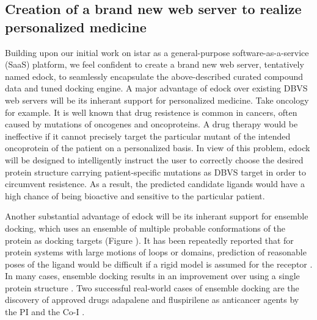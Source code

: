 \documentclass[a4paper,12pt]{article}
\begin{document}


\subsection*{Creation of a brand new web server to realize personalized medicine}

Building upon our initial work on istar \citep{1362} as a general-purpose software-as-a-service (SaaS) platform, we feel confident to create a brand new web server, tentatively named edock, to seamlessly encapsulate the above-described curated compound data and tuned docking engine. A major advantage of edock over existing DBVS web servers will be its inherant support for personalized medicine. Take oncology for example. It is well known that drug resistence is common in cancers, often caused by mutations of oncogenes and oncoproteins. A drug therapy would be ineffective if it cannot precisely target the particular mutant of the intended oncoprotein of the patient on a personalized basis. In view of this problem, edock will be designed to intelligently instruct the user to correctly choose the desired protein structure carrying patient-specific mutations as DBVS target in order to circumvent resistence. As a result, the predicted candidate ligands would have a high chance of being bioactive and sensitive to the particular patient.

Another substantial advantage of edock will be its inherant support for ensemble docking, which uses an ensemble of multiple probable conformations of the protein as docking targets (Figure ). It has been repeatedly reported that for protein systems with large motions of loops or domains, prediction of reasonable poses of the ligand would be difficult if a rigid model is assumed for the receptor \citep{1730}. In many cases, ensemble docking results in an improvement over using a single protein structure \citep{1128}. Two successful real-world cases of ensemble docking are the discovery of approved drugs adapalene and fluspirilene as anticancer agents by the PI and the Co-I \citep{1667,1681}.
\end{document}
